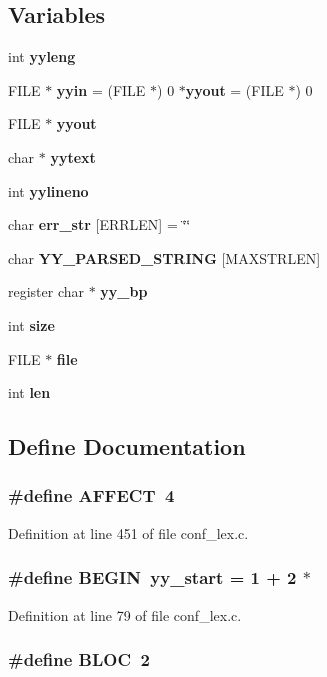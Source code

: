 \subsection*{Variables}
\begin{CompactItemize}
\item 
int {\bf yyleng}
\item 
FILE $\ast$ {\bf yyin} = (FILE $\ast$) 0 $\ast${\bf yyout} = (FILE $\ast$) 0
\item 
FILE $\ast$ {\bf yyout}
\item 
char $\ast$ {\bf yytext}
\item 
int {\bf yylineno}
\item 
char {\bf err\_\-str} [ERRLEN] = \char`\"{}\char`\"{}
\item 
char {\bf YY\_\-PARSED\_\-STRING} [MAXSTRLEN]
\item 
register char $\ast$ {\bf yy\_\-bp}
\item 
int {\bf size}
\item 
FILE $\ast$ {\bf file}
\item 
int {\bf len}
\end{CompactItemize}


\subsection{Define Documentation}
\subsubsection{\setlength{\rightskip}{0pt plus 5cm}\#define AFFECT\ 4}\label{conf__lex_8c_a43}




Definition at line 451 of file conf\_\-lex.c.
\subsubsection{\setlength{\rightskip}{0pt plus 5cm}\#define BEGIN\ yy\_\-start = 1 + 2 $\ast$}\label{conf__lex_8c_a7}




Definition at line 79 of file conf\_\-lex.c.
\subsubsection{\setlength{\rightskip}{0pt plus 5cm}\#define BLOC\ 2}\label{conf__lex_8c_a41}




